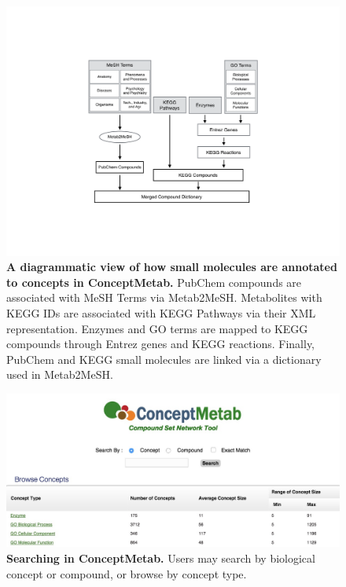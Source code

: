 \begin{figure}[ht!]
\centering
\includegraphics[width=1\textwidth]{chap3figs/figure3_1.pdf}
\caption[A diagrammatic view of how small molecules are annotated to concepts in ConceptMetab.]
{
\textbf{A diagrammatic view of how small molecules are annotated to concepts in ConceptMetab.} PubChem compounds are associated with MeSH Terms via Metab2MeSH. Metabolites with KEGG IDs are associated with KEGG Pathways via their XML representation. Enzymes and GO terms are mapped to KEGG compounds through Entrez genes and KEGG reactions. Finally, PubChem and KEGG small molecules are linked via a dictionary used in Metab2MeSH.
}
\label{chap3:fig:1}
\end{figure}

\newpage

\begin{figure}[ht!]
\centering
\includegraphics[width=1\textwidth]{chap3figs/figure3_2.jpg}
\caption[Searching in ConceptMetab.]
{
\textbf{Searching in ConceptMetab.} Users may search by biological concept or compound, or browse by concept type.
}
\label{chap3:fig:2}
\end{figure}


